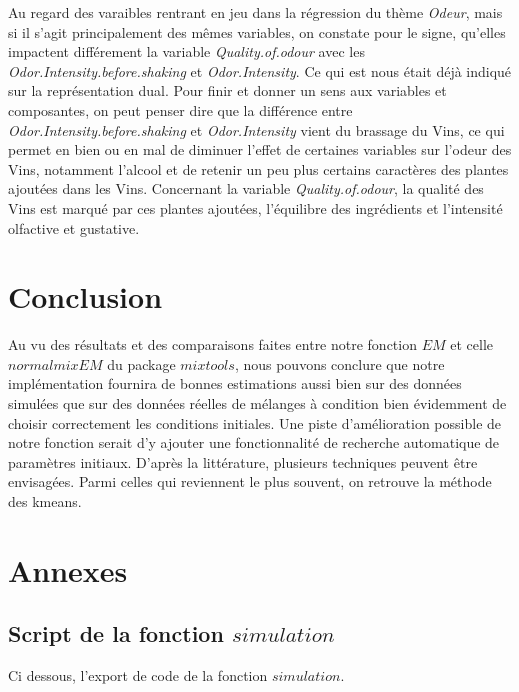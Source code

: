 \documentclass[a4paper,french,10pt]{article}
\begin{document}
\bigskip

Au regard des varaibles rentrant en jeu dans la régression du thème \textit{Odeur}, mais si il s'agit principalement des mêmes variables, on constate pour le signe, qu'elles impactent différement la variable \textit{Quality.of.odour} avec les \textit{Odor.Intensity.before.shaking} et \textit{Odor.Intensity}. Ce qui est nous était déjà indiqué sur la représentation dual. \newline
Pour finir et donner un sens aux variables et composantes, on peut penser dire que la différence entre \textit{Odor.Intensity.before.shaking} et \textit{Odor.Intensity} vient du brassage du Vins, ce qui permet en bien ou en mal de diminuer l'effet de certaines variables sur l'odeur des Vins, notamment l'alcool et de retenir un peu plus certains caractères des plantes ajoutées dans les Vins. Concernant la variable \textit{Quality.of.odour}, la qualité des Vins est marqué par ces plantes ajoutées, l'équilibre des ingrédients et l'intensité olfactive et gustative. 

\newpage

\section{Conclusion}

Au vu des résultats et des comparaisons faites entre notre fonction $EM$ et celle $normalmixEM$ du package $mixtools$, nous pouvons conclure que notre implémentation fournira de bonnes estimations aussi bien sur des données simulées que sur des données réelles de mélanges à condition bien évidemment de choisir correctement les conditions initiales. Une piste d'amélioration possible de notre fonction serait d'y ajouter une fonctionnalité de recherche automatique de paramètres initiaux. D'après la littérature, plusieurs techniques peuvent être envisagées. Parmi celles qui reviennent le plus souvent, on retrouve la méthode des kmeans.


\newpage


\section{Annexes}
\subsection{Script de la fonction $simulation$}
Ci dessous, l'export de code de la fonction $simulation$.

\end{document}
